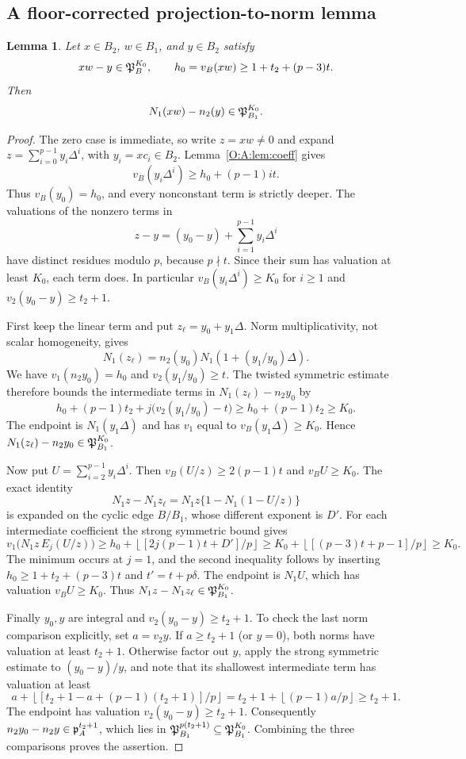 \documentclass[11pt]{amsart}
\newtheorem{lemma}[theorem]{Lemma}
\theoremstyle{definition}
\theoremstyle{remark}
\newcommand{\floor}[1]{\left\lfloor #1\right\rfloor}
\begin{document}
\subsection{A floor-corrected projection-to-norm lemma}
\begin{lemma}\label{O:A:lem:H17}
Let $x\in B_2$, $w\in B_1$, and $y\in B_2$ satisfy
\[
 xw-y\in\mathfrak P_B^{K_0},\qquad
 h_0=v_B(xw)\ge1+t_2+(p-3)t.
\]
Then
\[
 N_1(xw)-n_2(y)\in\mathfrak P_{B_1}^{K_0}.
\]
\end{lemma}
\begin{proof}
The zero case is immediate, so write $z=xw\ne0$ and expand
$z=\sum_{i=0}^{p-1}y_i\Delta^i$, with $y_i=xc_i\in B_2$.
Lemma~\ref{O:A:lem:coeff} gives
\[
 v_B(y_i\Delta^i)\ge h_0+(p-1)it.
\]
Thus $v_B(y_0)=h_0$, and every nonconstant term is strictly deeper.
The valuations of the nonzero terms in
\[
 z-y=(y_0-y)+\sum_{i=1}^{p-1}y_i\Delta^i
\]
have distinct residues modulo $p$, because $p\nmid t$.
Since their sum has valuation at least $K_0$, each term does.
In particular $v_B(y_i\Delta^i)\ge K_0$ for $i\ge1$ and
$v_2(y_0-y)\ge t_2+1$.

First keep the linear term and put $z_\ell=y_0+y_1\Delta$.
Norm multiplicativity, not scalar homogeneity, gives
\[
 N_1(z_\ell)=n_2(y_0)N_1(1+(y_1/y_0)\Delta).
\]
We have $v_1(n_2y_0)=h_0$ and $v_2(y_1/y_0)\ge t$.
The twisted symmetric estimate therefore bounds the intermediate
terms in $N_1(z_\ell)-n_2y_0$ by
\[
 h_0+(p-1)t_2+j\bigl(v_2(y_1/y_0)-t\bigr)
 \ge h_0+(p-1)t_2\ge K_0.
\]
The endpoint is $N_1(y_1\Delta)$ and has $v_1$ equal to
$v_B(y_1\Delta)\ge K_0$. Hence
$N_1(z_\ell)-n_2y_0\in\mathfrak P_{B_1}^{K_0}$.

Now put $U=\sum_{i=2}^{p-1}y_i\Delta^i$. Then
$v_B(U/z)\ge2(p-1)t$ and $v_BU\ge K_0$. The exact identity
\[
 N_1z-N_1z_\ell=N_1z\{1-N_1(1-U/z)\}
\]
is expanded on the cyclic edge $B/B_1$, whose different exponent is $D'$.
For each intermediate coefficient the strong symmetric bound gives
\[
 v_1\bigl(N_1z\,E_j(U/z)\bigr)
 \ge h_0+\floor{[2j(p-1)t+D']/p}
 \ge K_0+\floor{[(p-3)t+p-1]/p}\ge K_0.
\]
The minimum occurs at $j=1$, and the second inequality follows by inserting
$h_0\ge1+t_2+(p-3)t$ and $t'=t+p\delta$.
The endpoint is $N_1U$, which has valuation $v_BU\ge K_0$.
Thus $N_1z-N_1z_\ell\in\mathfrak P_{B_1}^{K_0}$.

Finally $y_0,y$ are integral and $v_2(y_0-y)\ge t_2+1$.
To check the last norm comparison explicitly, set $a=v_2y$.
If $a\ge t_2+1$ (or $y=0$), both norms have valuation at least $t_2+1$.
Otherwise factor out $y$, apply the strong symmetric estimate to
$(y_0-y)/y$, and note that its shallowest intermediate term has valuation
at least
\[
 a+\floor{[t_2+1-a+(p-1)(t_2+1)]/p}
 =t_2+1+\floor{(p-1)a/p}\ge t_2+1.
\]
The endpoint has valuation $v_2(y_0-y)\ge t_2+1$.
Consequently $n_2y_0-n_2y\in\mathfrak p_A^{t_2+1}$, which lies in
$\mathfrak P_{B_1}^{p(t_2+1)}\subseteq\mathfrak P_{B_1}^{K_0}$.
Combining the three comparisons proves the assertion.
\end{proof}
\end{document}
